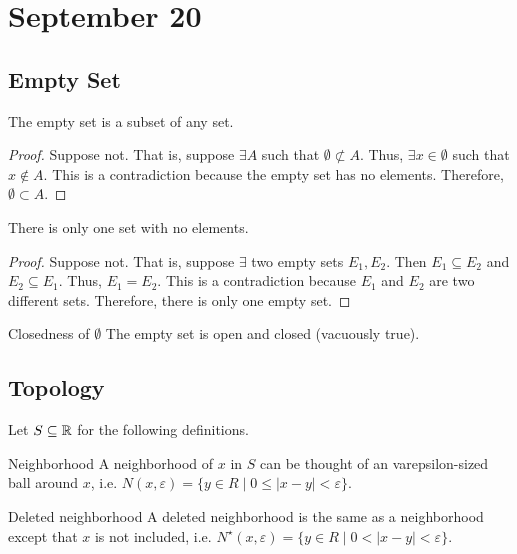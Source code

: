 \chapter{September 20}

\section{Empty Set}
\begin{theorem}{}{}
    The empty set is a subset of any set.
\end{theorem}
\begin{proof}
    Suppose not. That is, suppose $\exists A$ such that $\emptyset \not\subset A$. Thus, $\exists x \in \emptyset$ such that $x \not\in A$. This is a contradiction because the empty set has no elements. Therefore, $\emptyset \subset A$.
\end{proof}

\begin{theorem}{}{}
    There is only one set with no elements.
\end{theorem}
\begin{proof}
    Suppose not. That is, suppose $\exists$ two empty sets $E_1, E_2$. Then $E_1 \subseteq E_2$ and $E_2 \subseteq E_1$. Thus, $E_1 = E_2$. This is a contradiction because $E_1$ and $E_2$ are two different sets. Therefore, there is only one empty set.
\end{proof}
\begin{note}{Closedness of $\emptyset$}{}
    The empty set is open and closed (vacuously true).
\end{note}

\section{Topology}
Let $S \subseteq \mathbb{R}$ for the following definitions.

\begin{definition}{Neighborhood}{}
    A neighborhood of $x$ in $S$ can be thought of an varepsilon-sized ball around $x$, i.e. $N(x, \varepsilon) = \{ y \in R \mid 0 \leq |x - y| < \varepsilon \}$.
\end{definition}
\begin{definition}{Deleted neighborhood}{}
    A deleted neighborhood is the same as a neighborhood except that $x$ is not included, i.e. $N^\star(x, \varepsilon) = \{ y \in R \mid 0 < |x - y| < \varepsilon \}$.
\end{definition}

